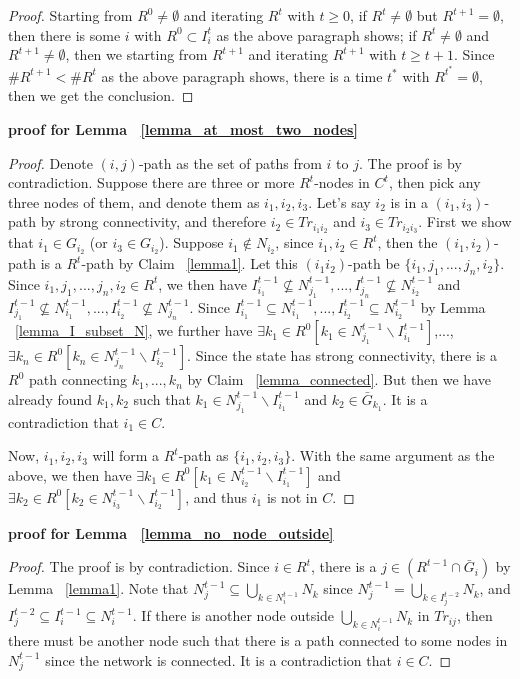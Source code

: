 \documentclass[12pt,letter]{article}
\theoremstyle{definition}
\theoremstyle{remark}
\theoremstyle{claim}
\begin{document}
\begin{proof}
Starting from $R^0\neq \emptyset$ and iterating $R^t$ with $t\geq 0$, if $R^t\neq \emptyset$ but $R^{t+1}= \emptyset$, then there is some $i$ with $R^0\subset I^t_i$ as the above paragraph shows; if $R^t\neq \emptyset$ and $R^{t+1}\neq \emptyset$, then we starting from $R^{t+1}$ and iterating $R^{t+1}$ with $t\geq t+1$. Since $\#R^{t+1}<\#R^t$ as the above paragraph shows, there is a time $t^{*}$ with $R^{t^{*}}=\emptyset$, then we get the conclusion.


\end{proof}




\noindent\textbf{proof for Lemma ~\ref{lemma_at_most_two_nodes}}

\begin{proof}
Denote $(i,j)$-path as the set of paths from $i$ to $j$. The proof is by contradiction. Suppose there are three or more $R^t$-nodes in $C^t$, then pick any three nodes of them, and denote them as $i_1,i_2,i_3$. Let's say $i_2$ is in a $(i_1,i_3)$-path by strong connectivity, and therefore $i_2\in Tr_{i_1i_2}$ and $i_3\in Tr_{i_2i_3}$. First we show that $i_1\in G_{i_2}$ (or $i_3\in G_{i_2}$). Suppose $i_1\notin N_{i_2}$, since $i_1,i_2\in R^t$, then the $(i_1,i_2)$-path is a $R^t$-path by Claim ~\ref{lemma1}. Let this $(i_1i_2)$-path be $\{i_1,j_1,...,j_n,i_2\}$. Since $i_1,j_1,...,j_n,i_2\in R^t$, we then have $I^{t-1}_{i_1}\nsubseteq N^{t-1}_{j_1},...,I^{t-1}_{j_n}\nsubseteq N^{t-1}_{i_2}$ and $I^{t-1}_{j_1}\nsubseteq N^{t-1}_{i_1},...,I^{t-1}_{i_2}\nsubseteq N^{t-1}_{j_n}$. Since $I^{t-1}_{i_1}\subseteq N^{t-1}_{i_1},...,I^{t-1}_{i_2}\subseteq N^{t-1}_{i_2}$ by Lemma ~\ref{lemma_I_subset_N}, we further have $\exists k_1\in R^0[k_1\in N^{t-1}_{j_1}\backslash I^{t-1}_{i_1}]$,...,$\exists k_n\in R^0[k_n\in N^{t-1}_{j_n}\backslash I^{t-1}_{i_2}]$. Since the state has strong connectivity, there is a $R^0$ path connecting $k_1,...,k_n$ by Claim ~\ref{lemma_connected}. But then we have already found $k_1,k_2$ such that $k_1\in N^{t-1}_{j_1}\backslash I^{t-1}_{i_1}$ and $k_2\in \bar{G}_{k_1}$. It is a contradiction that $i_1\in C$.

Now, $i_1,i_2,i_3$ will form a $R^t$-path as $\{i_1,i_2,i_3\}$. With the same argument as the above, we then have $\exists k_1\in R^0[k_1\in N^{t-1}_{i_2}\backslash I^{t-1}_{i_1}]$ and $\exists k_2\in R^0[k_2\in N^{t-1}_{i_3}\backslash I^{t-1}_{i_2}]$, and thus $i_1$ is not in $C$.
\end{proof}


\noindent\textbf{proof for Lemma ~\ref{lemma_no_node_outside}}
\begin{proof}
The proof is by contradiction. Since $i\in R^t$, there is a $j\in (R^{t-1}\cap \bar{G}_i)$ by Lemma ~\ref{lemma1}. Note that $N^{t-1}_j\subseteq \bigcup_{k\in N^{t-1}_i}N_k$ since $N^{t-1}_j =\bigcup_{k\in I^{t-2}_j}N_k$, and $I^{t-2}_j\subseteq I^{t-1}_i\subseteq N^{t-1}_i$. If there is another node outside $\bigcup_{k\in N^{t-1}_i}N_k$ in $Tr_{ij}$, then there must be another node such that there is a path connected to some nodes in $N^{t-1}_j$ since the network is connected. It is a contradiction that $i\in C$.

\end{proof}
\end{document}
